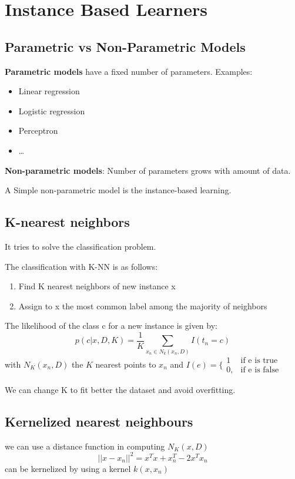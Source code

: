 \section{Instance Based Learners}
\subsection{Parametric vs Non-Parametric Models}

\textbf{Parametric models} have a fixed number of parameters. Examples:
\begin{itemize}
    \item Linear regression
    \item Logistic regression
    \item Perceptron
    \item \dots
\end{itemize}

\textbf{Non-parametric models}: Number of parameters grows with amount of data. 

A Simple non-parametric model is the instance-based learning.

\subsection{K-nearest neighbors}
It tries to solve the classification problem.

The classification with K-NN is as follows:
\begin{enumerate}
    \item Find K nearest neighbors of new instance x
    \item Assign to x the most common label among the majority of neighbors
\end{enumerate}

The likelihood of the class c for a new instance is given by:
\begin{equation}
    p(c|x, D, K) = \frac{1}{K} \sum_{x_{n} \in N_{k}(x_{n}, D)} I(t_{n} = c)
\end{equation}
with $N_{K}(x_{n}, D)$ the $K$ nearest points to $x_{n}$ and $I(e) = \{\begin{array}{lr}
        1 & \text{if e is true}\\
        0, & \text{if e is false}
        \end{array}$

We can change K to fit better the dataset and avoid overfitting.

\subsection{Kernelized nearest neighbours}
we can use a distance function in computing $N_{K}(x, D)$
\begin{equation}
    ||x-x_{n}||^{2} = x^{T}x + x^{T}_{n} - 2x^{T}x_{n}
\end{equation}
can be kernelized by using a kernel $k(x, x_{n})$

